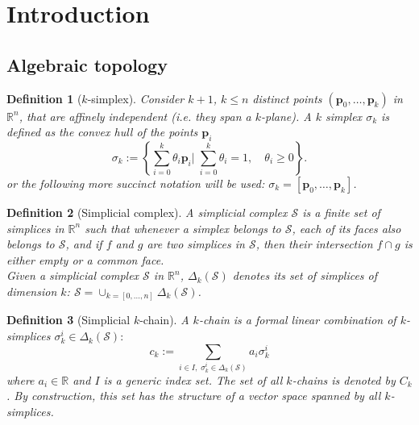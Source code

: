 \documentclass{elsarticle}
\newtheorem{definition}{Definition}
\newcommand{\bbR}{\mathbb{R}}
\begin{document}
\section{Introduction}

\subsection{Algebraic topology}



\begin{definition}[$k$-simplex]
Consider $k+1$, $k\le n$ distinct points $(\mathbf{p}_0, \dots, \mathbf{p}_k)$ in $\bbR^n$, that are affinely independent (i.e. they span a $k$-plane). A $k$ simplex $\sigma_k$ is defined as
the convex hull of the points $\mathbf{p}_i$
\begin{equation}
    \sigma_k :=
     \left\{\sum_{i=0}^k \theta_i \mathbf{p}_i \Bigg| \;  \sum_{i=0}^k \theta_i = 1, \quad \theta_i\ge 0 \right\}.
\end{equation}
or the following more succinct notation will be used: $\sigma_k = [\mathbf{p}_0, \dots, \mathbf{p}_k]$.
\end{definition}

\begin{definition}[Simplicial complex]
A simplicial complex $\mathcal{S}$ is a finite set  of simplices in $\bbR^n$ such that whenever a simplex belongs to $\mathcal{S}$, each of its faces also belongs to $\mathcal{S}$, and if $f$ and $g$ are two simplices in $\mathcal{S}$, then their intersection $f \cap g$ is either empty or a common face. \\

\noindent Given a  simplicial complex $\mathcal{S}$ in $\bbR^n$, $\Delta_k(\mathcal{S})$ denotes its set of simplices of dimension $k$:
$\mathcal{S}=\cup_{k=[0, \dots, n]} \Delta_k(\mathcal{S})$.
\end{definition}

  

\begin{definition}[Simplicial $k$-chain]
A $k$-chain is a formal linear combination of $k$-simplices $\sigma_k^i
\in \Delta_k(\mathcal{S}):$
\begin{equation}
c_k := \sum_{i \in I, \; \sigma_k^i
\in \Delta_k(\mathcal{S})} a_i \sigma_k^i
\end{equation}
where $a_i \in \mathbb{R}$ and $I$ is a generic index set. The set of all
$k$-chains is denoted by $C_k$. By construction, this set has the structure of a vector space spanned by all $k$-simplices.
\end{definition}
\end{document}
